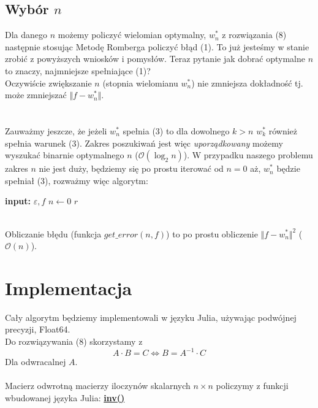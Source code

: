 \documentclass{article}
\begin{document}
\subsection*{Wybór $n$}
Dla danego $n$ możemy policzyć wielomian optymalny, $w_n^*$ z rozwiązania (8) następnie stosując Metodę Romberga policzyć błąd (1). To już jesteśmy w stanie zrobić z powyższych wniosków i pomysłów. Teraz pytanie jak dobrać optymalne $n$ to znaczy, najmniejsze spełniające (1)?\\
Oczywiście zwiększanie $n$ (stopnia wielomianu $w_n^*$) nie zmniejsza dokładność tj. może zmniejszać $\Vert f - w_n^*\Vert$.\\\\\\
Zauważmy jeszcze, że jeżeli $w_n^*$ spełnia (3) to dla dowolnego $k > n$ $w_k^*$ również spełnia warunek (3). Zakres poszukiwań jest więc \textit{uporządkowany} możemy wyszukać binarnie optymalnego $n$ ($\mathcal{O}(\log_2{n})$). W przypadku naszego problemu zakres $n$ nie jest duży, będziemy się po prostu iterować od $n = 0$ aż, $w_n^*$ będzie spełniał (3), rozważmy więc algorytm:
\begin{algorithm}
\begin{algorithmic}
\STATE \textbf{input:} $\varepsilon, f$
\STATE $n \leftarrow 0$
\ENDWHILE
\RETURN $r$
\end{algorithmic}
\end{algorithm}
\\Obliczanie błędu (funkcja $get\_error(n,f)$) to po prostu obliczenie $\Vert f - w_n^*\Vert^2$ ($\mathcal{O}({n})$).
\section{Implementacja}
Cały algorytm będziemy implementowali w języku Julia, używając podwójnej
precyzji, Float64.\\
Do rozwiązywania (8) skorzystamy z
$$
A \cdot B = C \iff B = A^{-1}\cdot C
$$
Dla odwracalnej $A$.\\\\
Macierz odwrotną macierzy iloczynów skalarnych $n \times n$ policzymy z funkcji wbudowanej języka Julia: 
\href{https://docs.julialang.org/en/v1/base/math/#Base.inv-Tuple{Number}}{\textbf{inv()}}
\end{document}
